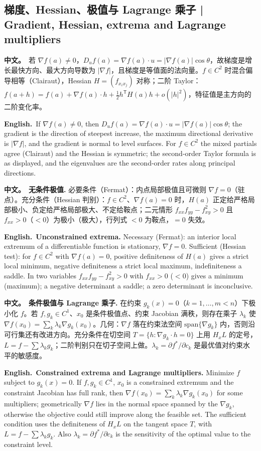 \documentclass[UTF8,11pt,a4paper]{ctexart}
\newcommand{\BOTH}[2]{\par\noindent\textbf{中文。}\ #1\par\noindent\textbf{English.}\ #2\par}
\begin{document}
\subsection{梯度、Hessian、极值与 Lagrange 乘子 | Gradient, Hessian, extrema and Lagrange multipliers}
\BOTH{若 $\nabla f(a)\ne0$，$D_uf(a)=\nabla f(a)\cdot u=|\nabla f(a)|\cos\theta$，故梯度是增长最快方向、最大方向导数为 $|\nabla f|$，且梯度是等值面的法向量。$f\in C^2$ 时混合偏导相等（Clairaut），Hessian $H=(f_{x_ix_j})$ 对称；二阶 Taylor：$f(a+h)=f(a)+\nabla f(a)\cdot h+\tfrac12h^{\mathsf T}H(a)h+o(|h|^2)$，特征值是主方向的二阶变化率。}{If $\nabla f(a)\ne0$, then $D_uf(a)=\nabla f(a)\cdot u=|\nabla f(a)|\cos\theta$; the gradient is the direction of steepest increase, the maximum directional derivative is $|\nabla f|$, and the gradient is normal to level surfaces. For $f\in C^2$ the mixed partials agree (Clairaut) and the Hessian is symmetric; the second-order Taylor formula is as displayed, and the eigenvalues are the second-order rates along principal directions.}
\BOTH{\textbf{无条件极值.} 必要条件（Fermat）：内点局部极值且可微则 $\nabla f=0$（驻点）。充分条件（Hessian 判别）：$f\in C^2$、$\nabla f(a)=0$ 时，$H(a)$ 正定给严格局部极小、负定给严格局部极大、不定给鞍点；二元情形 $f_{xx}f_{yy}-f_{xy}^2>0$ 且 $f_{xx}>0$（$<0$）为极小（极大），行列式 $<0$ 为鞍点，$=0$ 失效。}{\textbf{Unconstrained extrema.} Necessary (Fermat): an interior local extremum of a differentiable function is stationary, $\nabla f=0$. Sufficient (Hessian test): for $f\in C^2$ with $\nabla f(a)=0$, positive definiteness of $H(a)$ gives a strict local minimum, negative definiteness a strict local maximum, indefiniteness a saddle. In two variables $f_{xx}f_{yy}-f_{xy}^2>0$ with $f_{xx}>0$ ($<0$) gives a minimum (maximum); a negative determinant a saddle; a zero determinant is inconclusive.}
\BOTH{\textbf{条件极值与 Lagrange 乘子.} 在约束 $g_k(x)=0$（$k=1,\ldots,m<n$）下极小化 $f$。若 $f,g_k\in C^1$、$x_0$ 是条件极值点、约束 Jacobian 满秩，则存在乘子 $\lambda_k$ 使 $\nabla f(x_0)=\sum_k\lambda_k\nabla g_k(x_0)$。几何：$\nabla f$ 落在约束法空间 $\mathrm{span}\{\nabla g_k\}$ 内，否则沿可行集还有改进方向。充分条件在切空间 $T=\{h:\nabla g_k\cdot h=0\}$ 上用 $H_xL$ 的定号，$L=f-\sum\lambda_kg_k$；二阶判别只在切子空间上做。$\lambda_k=\partial f^*/\partial c_k$ 是最优值对约束水平的敏感度。}{\textbf{Constrained extrema and Lagrange multipliers.} Minimize $f$ subject to $g_k(x)=0$. If $f,g_k\in C^1$, $x_0$ is a constrained extremum and the constraint Jacobian has full rank, then $\nabla f(x_0)=\sum_k\lambda_k\nabla g_k(x_0)$ for some multipliers; geometrically $\nabla f$ lies in the normal space spanned by the $\nabla g_k$, otherwise the objective could still improve along the feasible set. The sufficient condition uses the definiteness of $H_xL$ on the tangent space $T$, with $L=f-\sum\lambda_kg_k$. Also $\lambda_k=\partial f^*/\partial c_k$ is the sensitivity of the optimal value to the constraint level.}
\end{document}
